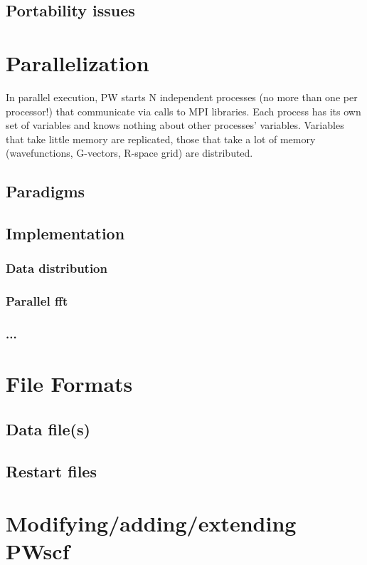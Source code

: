 \documentclass[12pt]{article}
\begin{document}
\subsection{Portability issues}

\section{Parallelization}

In parallel execution, PW starts N independent
processes (no more than one per processor!)
that communicate via calls to MPI libraries. 
Each process has its own set of variables and knows 
nothing about other processes' variables. Variables 
that take little memory are replicated, those that 
take a lot of memory (wavefunctions, G-vectors, R-space
grid) are distributed.

\subsection{Paradigms}
\subsection{Implementation}
\subsubsection{Data distribution}
\subsubsection{Parallel fft}
\subsubsection{...}

\section{File Formats}
\subsection{Data file(s)}
\subsection{Restart files}

\section{Modifying/adding/extending PWscf}
\end{document}
